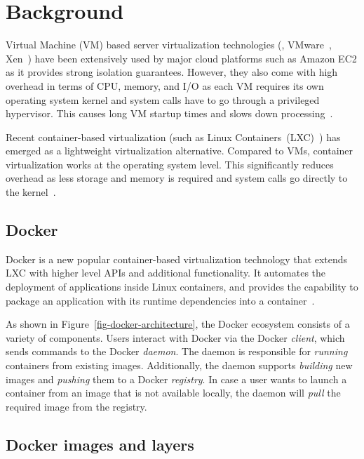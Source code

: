 \section{Background}
\label{sec:background}


Virtual Machine (VM) based server virtualization technologies (\eg, VMware~\cite{VMware}, Xen~\cite{xen}) 
have been extensively used by major cloud
platforms such as Amazon EC2 as it provides strong isolation guarantees.
%
However, they also come with high overhead in terms of CPU, memory, and I/O as
each VM requires its own operating system kernel and system calls have to go
through a privileged hypervisor. This causes long VM startup times and slows down
processing~\cite{Disco}.

Recent container-based virtualization (such as Linux Containers~(LXC)~\cite{LXC}) has emerged 
as a lightweight virtualization alternative.
Compared to VMs, container virtualization works at the
operating system level.
This significantly reduces overhead as less storage and memory is
required and system calls go directly to the kernel~\cite{ContainerVirtualization}. 

\subsection{Docker}

Docker is a new popular container-based virtualization technology that extends LXC
with higher level APIs and additional functionality. It automates the deployment of
applications inside Linux containers, and provides the capability to package an
application with its runtime dependencies into a container~\cite{slacker}.


As shown in Figure~\ref{fig-docker-architecture}, the Docker ecosystem consists
of a variety of components.
%
Users interact with Docker via the Docker \emph{client}, which sends commands
to the Docker \emph{daemon}. The daemon is responsible for \emph{running} containers
from existing images. Additionally, the daemon supports \emph{building} new images and
\emph{pushing} them to a Docker \emph{registry}. In case a user wants to launch a
container from an image that is not available locally, the daemon will \emph{pull}
the required image from the registry.
\subsection{Docker images and layers}
\label{sec-image-layers}

